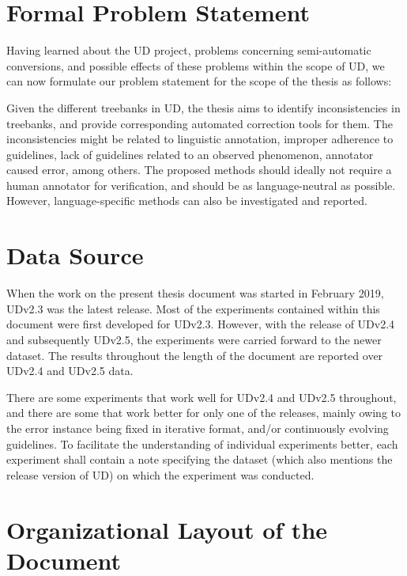 \section{Formal Problem Statement}

Having learned about the UD project, problems concerning semi-automatic conversions, and possible effects of these problems within the scope of UD, we can now formulate our problem statement for the scope of the thesis as follows:

Given the different treebanks in UD, the thesis aims to identify inconsistencies in treebanks, and provide corresponding automated correction tools for them. The inconsistencies might be related to linguistic annotation, improper adherence to guidelines, lack of guidelines related to an observed phenomenon, annotator caused error, among others. The proposed methods should ideally not require a human annotator for verification, and should be as language-neutral as possible. However, language-specific methods can also be investigated and reported.

\section{Data Source}

When the work on the present thesis document was started in February 2019, UDv2.3 \citep{UDv2.3} was the latest release. Most of the experiments contained within this document were first developed for UDv2.3. However, with the release of UDv2.4 and subsequently UDv2.5, the experiments were carried forward to the newer dataset. The results throughout the length of the document are reported over UDv2.4 and UDv2.5 data.

There are some experiments that work well for UDv2.4 and UDv2.5 throughout, and there are some that work better for only one of the releases, mainly owing to the error instance being fixed in iterative format, and/or continuously evolving guidelines. To facilitate the understanding of individual experiments better, each experiment shall contain a note specifying the dataset (which also mentions the release version of UD) on which the experiment was conducted.

\section{Organizational Layout of the Document}

